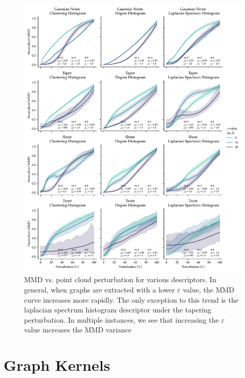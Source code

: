 \begin{figure}
  \includegraphics[width=\textwidth]{./figures/results/res_2_1.pdf}
  \caption[MMD vs. point cloud perturbation for various descriptors.]{MMD vs. point cloud perturbation for various descriptors. In general,
when graphs are extracted with a lower $\varepsilon$ value, the MMD curve
increases more rapidly. The only exception to this trend is the laplacian
spectrum histogram descriptor under the tapering perturbation. In multiple
instances, we see that increasing the $\varepsilon$ value increases the MMD variance}
  \label{fig:mmd_sensitivity_eps}
\end{figure}

\section{Graph Kernels}\label{sec:results_graph_kernels}

